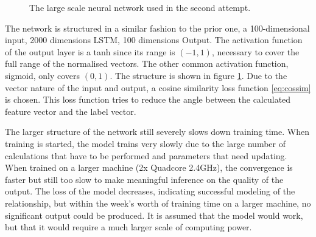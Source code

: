 \documentclass[10pt, a4paper]{UUThesisTemplate}
\begin{document}
\begin{figure}
\caption{The large scale neural network used in the second attempt.}\label{fig:nnlarge}
\end{figure}

The network is structured in a similar fashion to the prior one, a 100-dimensional input, 2000 dimensions LSTM, 100 dimensions Output. The activation function of the output layer is a tanh since its range is $(-1, 1)$, necessary to cover the full range of the normalised vectors. The other common activation function, sigmoid, only covers $(0,1)$. The structure is shown in figure \ref{fig:nnlarge}. Due to the vector nature of the input and output, a cosine similarity loss function \eqref{eq:cossim} is chosen. This loss function tries to reduce the angle between the calculated feature vector and the label vector.

 The larger structure of the network still severely slows down training time. When training is started, the model trains very slowly due to the large number of calculations that have to be performed and parameters that need updating. When trained on a larger machine (2x Quadcore 2.4GHz), the convergence is faster but still too slow to make meaningful inference on the quality of the output. The loss of the model decreases, indicating successful modeling of the relationship, but within the week's worth of training time on a larger machine, no significant output could be produced. It is assumed that the model would work, but that it would require a much larger scale of computing power.
\end{document}
